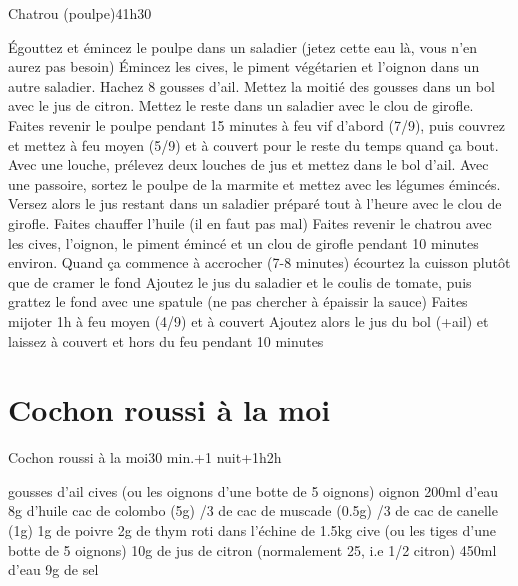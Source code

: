 {\begin{recette}{Chatrou (poulpe)}{4}{1h30}{}
\begin{preparation}
\etape Égouttez et émincez le poulpe dans un saladier (jetez cette eau là, vous n'en aurez pas besoin)
\etape Émincez les cives, le piment végétarien et l'oignon dans un autre saladier.
\etape Hachez 8 gousses d'ail. Mettez la moitié des gousses dans un bol avec le jus de citron. Mettez le reste dans un saladier avec le clou de girofle.
\etape Faites revenir le poulpe pendant 15 minutes à feu vif d'abord (7/9), puis couvrez et mettez à feu moyen (5/9) et à couvert pour le reste du temps quand ça bout. 
\etape Avec une louche, prélevez deux louches de jus et mettez dans le bol d'ail. Avec une passoire, sortez le poulpe de la marmite et mettez avec les légumes émincés. Versez alors le jus restant dans un saladier préparé tout à l'heure avec le clou de girofle.
\etape Faites chauffer l'huile (il en faut pas mal)
\etape Faites revenir le chatrou avec les cives, l'oignon, le piment émincé et un clou de girofle pendant 10 minutes environ. Quand ça commence à accrocher (7-8 minutes) écourtez la cuisson plutôt que de cramer le fond
\etape Ajoutez le jus du saladier et le coulis de tomate, puis grattez le fond avec une spatule (ne pas chercher à épaissir la sauce)
\etape Faites mijoter 1h à feu moyen (4/9) et à couvert
\etape Ajoutez alors le jus du bol (+ail) et laissez à couvert et hors du feu pendant 10 minutes
\end{preparation}
\end{recette}


\section{Cochon roussi à la moi}
\begin{recette}{Cochon roussi à la moi}{}{30 min.+1 nuit+1h}{2h}
\begin{ingredients}
\ingredient[Marinade]
 gousses d'ail
\ingredient cives (ou les oignons d'une botte de 5 oignons)
 oignon
\ingredient 200ml d'eau
\ingredient 8g d'huile
 cac de colombo (5g)
/3 de cac de muscade (0.5g)
/3 de cac de canelle (1g)
\ingredient 1g de poivre
\ingredient 2g de thym
\ingredient[cuisson]
 roti dans l'échine de 1.5kg
 cive (ou les tiges d'une botte de 5 oignons)
\ingredient 10g de jus de citron (normalement 25, i.e 1/2 citron)
\ingredient 450ml d'eau
\ingredient 9g de sel
\end{ingredients}


\end{recette}}
